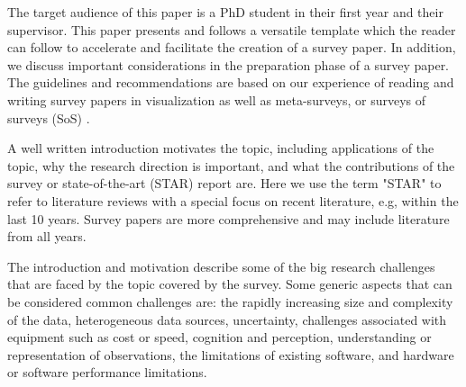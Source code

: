 The target audience of this paper is a PhD student in their first year and their supervisor. This paper presents and follows a versatile template which the reader can follow to accelerate and facilitate the creation of a survey paper. In addition, we discuss important considerations in the preparation phase of a survey paper. The guidelines and recommendations are based on our experience of reading and writing survey papers in visualization \cite{post2003state, laramee2004state, laramee2007topology,  peng2009higher, mcloughlin2010over, edmunds2012surface, lipsa2012visualization, borgo2013glyph, chung2014glyph, tong2018storytelling, firat2018towards, roberts2018visualising, rees2019survey} as well as meta-surveys, or surveys of surveys (SoS) \cite{mcnabb2017sos, alharbi2017molecular, alharbi2018sos, alharbi2019sos}.


 A well written introduction motivates the topic, including applications of the topic, why the research direction is important, and what the contributions of the survey or state-of-the-art (STAR) report are. Here we use the term "STAR" to refer to literature reviews with a special focus on recent literature, e.g, within the last 10 years. Survey papers are more comprehensive and may include literature from all years.

The introduction and motivation describe some of the big research challenges that are faced by the topic covered by the survey. Some generic aspects that can be considered common challenges are: the rapidly increasing size and complexity of the data, heterogeneous data sources, uncertainty, challenges associated with equipment such as cost or speed, cognition and perception, understanding or representation of observations, the limitations of existing software, and hardware or software performance limitations.

